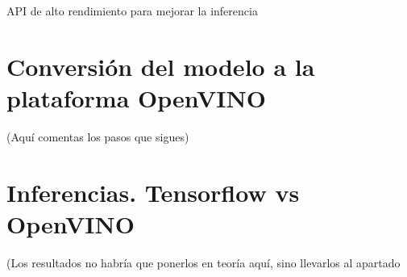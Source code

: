 API de alto rendimiento para mejorar la inferencia


\section{Conversión del modelo a la plataforma OpenVINO}\label{sec:conversión-del-modelo-a-la-plataforma-openvino}
(Aquí comentas los pasos que sigues)


\section{Inferencias. Tensorflow vs OpenVINO}\label{sec:inferencias.-tensorflow-vs-openvino}
(Los resultados no habría que ponerlos en teoría aquí, sino llevarlos al apartado